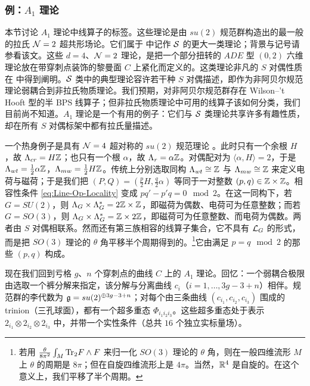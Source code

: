 \subsubsection{例：$A_1$ 理论}\label{subsubsec:A1-labels}

本节讨论 $A_1$ 理论中线算子的标签。这些理论是由 $su(2)$ 规范群构造出的最一般的拉氏 $\mathcal{N}=2$ 超共形场论。它们属于 \cite{Gaiotto:2009hg} 中记作 $\mathcal{S}$ 的更大一类理论；背景与记号请参看该文。这些 $d=4$、$\mathcal{N}=2$ 理论，是把一个部分扭转的 $ADE$ 型 $(0,2)$ 六维理论放在带穿刺点装饰的黎曼面 $C$ 上紧化而定义的。这类理论非凡的 $S$ 对偶性质在 \cite{Gaiotto:2009we} 中得到阐明。$\mathcal{S}$ 类中的典型理论容许若干种 $S$ 对偶描述，即作为非阿贝尔规范理论弱耦合到非拉氏物质理论。我们预期，对非阿贝尔规范群存在 Wilson–'t Hooft 型的半 BPS 线算子；但非拉氏物质理论中可用的线算子该如何分类，我们目前尚不知道。$A_1$ 理论是一个有用的例子：它们与 $\mathcal{S}$ 类理论共享许多有趣性质，却在所有 $S$ 对偶标架中都有拉氏量描述。

一个热身例子是具有 $\mathcal{N}=4$ 超对称的 $su(2)$ 规范理论 \cite{Kapustin:2006pk}。此时只有一个余根 $H$，故 $\Lambda_{cr} = H \mathbb{Z}$；也只有一个根 $\alpha$，故 $\Lambda_r = \alpha \mathbb{Z}$。对偶配对为 $\langle \alpha, H\rangle = 2$，于是 $\Lambda_{wt} = \tfrac{1}{2} \alpha \mathbb{Z}$，$\Lambda_{mw} = \tfrac{1}{2} H \mathbb{Z}$。传统上分别选取同构 $\Lambda_{wt} \cong \mathbb{Z}$ 与 $\Lambda_{mw} \cong \mathbb{Z}$ 来定义电荷与磁荷；于是我们把 $(P,Q) = (\frac{p}{2} H, \frac{q}{2}\alpha)$ 等同于一对整数 $(p,q)\in \mathbb{Z}\times \mathbb{Z}$。相容性条件 \eqref{eq:Line-Op-Locality} 变成 $pq'-p'q= 0 \mod 2$。在这一同构下，若 $G = SU(2)$，则 $\Lambda_G \times \Lambda_G^* = 2\mathbb{Z} \times \mathbb{Z}$，即磁荷为偶数、电荷可为任意整数；而若 $G=SO(3)$，则 $\Lambda_G \times \Lambda_G^* =  \mathbb{Z} \times 2\mathbb{Z}$，即磁荷可为任意整数、而电荷为偶数。两者由 $S$ 对偶相联系。然而还有第三族相容的线算子集合，它不具有 $\mathcal{L}_G$ 的形式，而是把 $SO(3)$ 理论的 $\theta$ 角平移半个周期得到的。\footnote{若用 $\frac{\theta}{8 \pi^2} \int_M {\operatorname{Tr}}_{2} F\wedge F$ 来归一化 $SO(3)$ 理论的 $\theta$ 角，则在一般四维流形 $M$ 上 $\theta$ 的周期是 $8 \pi$；但在自旋四维流形上是 $4\pi$。当然，$\mathbb{R}^4$ 是自旋的。在这个意义上，我们平移了半个周期。}它由满足 $p=q \mod 2$ 的那些 $(p,q)$ 构成。

现在我们回到亏格 $g$、$n$ 个穿刺点的曲线 $C$ 上的 $A_1$ 理论。回忆：一个弱耦合极限由选取一个裤分解来指定，该分解与分离曲线 $c_i$（$i=1,\dots, 3g-3+n$）相伴。规范群的李代数为 $\mathfrak{g} = su(2)^{\oplus 3g-3 + n}$；对每个由三条曲线 $(c_{i_1}, c_{i_2},c_{i_3})$ 围成的 trinion（三孔球面），都有一个超多重态 $\Phi_{i_1i_2i_3}$。这些超多重态处于表示 $2_{i_1}\otimes 2_{i_2} \otimes 2_{i_3}$ 中，并带一个实性条件（总共 $16$ 个独立实标量场）\cite{Gaiotto:2009we}。

